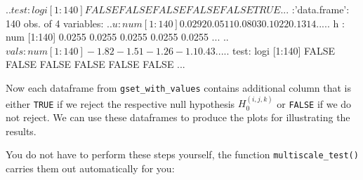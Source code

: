 \documentclass[a4paper]{scrartcl}
\begin{document}
\begin{enumerate}[label=\textit{Step \arabic*.}, leftmargin=1.45cm]
\begin{Schunk}
\begin{Soutput}
  ..$ test: logi [1:140] FALSE FALSE FALSE FALSE FALSE TRUE ...
 $ :'data.frame':	140 obs. of  4 variables:
  ..$ u   : num [1:140] 0.0292 0.0511 0.0803 0.1022 0.1314 ...
  ..$ h   : num [1:140] 0.0255 0.0255 0.0255 0.0255 0.0255 ...
  ..$ vals: num [1:140] -1.82 -1.51 -1.26 -1.1 0.43 ...
  ..$ test: logi [1:140] FALSE FALSE FALSE FALSE FALSE FALSE ...
\end{Soutput}
\end{Schunk}
Now each dataframe from \verb|gset_with_values| contains additional column that is either \verb|TRUE| if we reject the respective null hypothesis $H_0^{(i, j, k)}$ or \verb|FALSE| if we do not reject. We can use these dataframes to produce the plots for illustrating the results.
\end{enumerate}

You do not have to perform these steps yourself, the function \verb|multiscale_test()| carries them out automatically for you:
\end{document}
